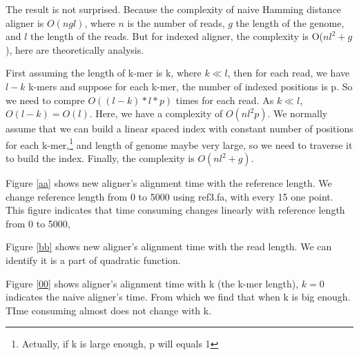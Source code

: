 \documentclass[a4paper]{article}
\begin{document}
The result is not surprised. Because the  complexity of naive Hamming distance aligner is $O(ngl)$, where $n$ is the number of reads, $g$ the length of the genome, and $l$ the length of the reads. But for indexed aligner, the complexity is O($nl^2+g$), here are theoretically analysis.

First assuming the length of k-mer is k, where $ k\ll l$, then for each read, we have $l-k$ k-mers and suppose for each k-mer, the number of indexed positions is p. So we need to compre $O((l-k)*l*p)$ times for each read. As $k\ll l$, $O(l-k)=O(l)$. Here, we have a complexity of $O(nl^{2}p)$. We normally assume that we can build a linear spaced index with constant number of positions for each k-mer,\footnote{Actually, if k is large enough, p will equals 1} and length of genome maybe very large, so we need to traverse it to build the index. Finally, the complexity is $O(nl^{2} + g)$.

Figure \ref{aa} shows new aligner's alignment time with the reference length. We change reference length from 0 to 5000 using ref3.fa, with every 15 one point. This figure indicates that time consuming changes linearly with reference length from 0 to 5000, 

Figure \ref{bb} shows new aligner's alignment time with the read length. We can identify it is a part of quadratic function.

Figure \ref{00} shows aligner's alignment time with k (the k-mer length), $k=0$ indicates the naive aligner's time. From which we find that when k is big enough. TIme consuming almost does not change with k.
\end{document}
